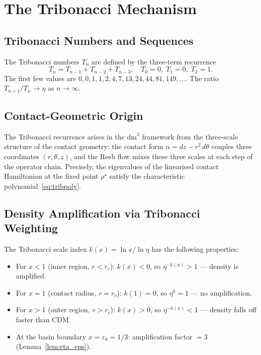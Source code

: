 \documentclass[11pt,a4paper,openright]{book}
\theoremstyle{dm3thm}
\theoremstyle{dm3def}
\newcommand{\dm}{\mathrm{dm}^3}
\newcommand{\eps}{\varepsilon_0}
\newcommand{\rc}{r_c}
\newcommand{\etaT}{\eta}   %
\begin{document}
\chapter{The Tribonacci Mechanism}
\label{ch:tribonacci}

\section{Tribonacci Numbers and Sequences}

The Tribonacci numbers $T_n$ are defined by the three-term recurrence
\begin{equation}
  T_n = T_{n-1} + T_{n-2} + T_{n-3}, \quad T_0=0,\; T_1=0,\; T_2=1.
\end{equation}
The first few values are $0,0,1,1,2,4,7,13,24,44,81,149,\ldots$.  The ratio
$T_{n+1}/T_n \to \etaT$ as $n\to\infty$.

\section{Contact-Geometric Origin}

The Tribonacci recurrence arises in the $\dm$ framework from the three-scale
structure of the contact geometry: the contact form $\alpha = dz - r^2\,d\theta$
couples three coordinates $(r,\theta,z)$, and the Reeb flow mixes these three
scales at each step of the operator chain.  Precisely, the eigenvalues of the
linearised contact Hamiltonian at the fixed point $\rho^\star$ satisfy the
characteristic polynomial~\eqref{eq:tribpoly}.

\section{Density Amplification via Tribonacci Weighting}

The Tribonacci scale index $k(x) = \ln x / \ln \etaT$ has the following
properties:
\begin{itemize}
  \item For $x < 1$ (inner region, $r < \rc$): $k(x) < 0$, so
    $\etaT^{-k(x)} > 1$ — density is amplified.
  \item For $x = 1$ (contact radius, $r = \rc$): $k(1) = 0$, so
    $\etaT^{0} = 1$ — no amplification.
  \item For $x > 1$ (outer region, $r > \rc$): $k(x) > 0$, so
    $\etaT^{-k(x)} < 1$ — density falls off faster than CDM.
  \item At the basin boundary $x = \eps = 1/3$: amplification factor $= 3$
    (Lemma~\ref{lem:eta_eps}).
\end{itemize}
\end{document}
